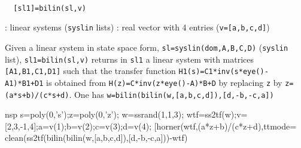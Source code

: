 \begin{mandesc}
   \\ %
\end{mandesc}
\begin{calling_sequence}
\begin{verbatim}
  [sl1]=bilin(sl,v)  
\end{verbatim}
\end{calling_sequence}
\begin{parameters}
  \begin{varlist}
    : linear systems (\verb!syslin! lists)
    : real vector with 4 entries (\verb!v=[a,b,c,d]!)
  \end{varlist}
\end{parameters}
\begin{mandescription}
  Given a linear system in state space form, \verb!sl=syslin(dom,A,B,C,D)! 
  (\verb!syslin! list), \verb!sl1=bilin(sl,v)!  returns in \verb!sl1! a 
  linear system with matrices \verb![A1,B1,C1,D1]! such that
  the transfer function \verb!H1(s)=C1*inv(s*eye()-A1)*B1+D1! is
  obtained from \verb!H(z)=C*inv(z*eye()-A)*B+D! by replacing \verb!z!
  by \verb!z=(a*s+b)/(c*s+d)!.
  One has \verb!w=bilin(bilin(w,[a,b,c,d]),[d,-b,-c,a])!
\end{mandescription}
\begin{examples}
  \begin{mintednsp}{nsp}
    s=poly(0,'s');z=poly(0,'z');
    w=ssrand(1,1,3);
    wtf=ss2tf(w);v=[2,3,-1,4];a=v(1);b=v(2);c=v(3);d=v(4);
    [horner(wtf,(a*z+b)/(c*z+d),ttmode=%
    clean(ss2tf(bilin(bilin(w,[a,b,c,d]),[d,-b,-c,a]))-wtf)
  \end{mintednsp}
\end{examples}
\begin{manseealso}
     
\end{manseealso}
